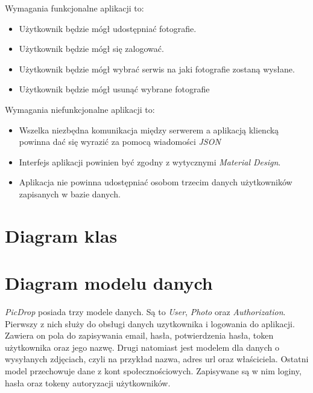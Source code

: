 \documentclass[brudnopis]{xmgr}
\begin{document}
 Wymagania funkcjonalne aplikacji to: 
\begin{itemize}
  \item Użytkownik będzie mógł udostępniać fotografie. 
  \item Użytkownik będzie mógł się zalogować.
  \item Użytkownik będzie mógł wybrać serwis na jaki fotografie zostaną wysłane.
  \item Użytkownik będzie mógł usunąć wybrane fotografie
\end{itemize}

Wymagania niefunkcjonalne aplikacji to: 
\begin{itemize}
  \item Wszelka niezbędna komunikacja między serwerem a aplikacją kliencką powinna dać się wyrazić za pomocą wiadomości \textit{JSON}
  \item Interfejs aplikacji powinien być zgodny z wytycznymi \textit{Material Design}.
  \item Aplikacja nie powinna udostępniać osobom trzecim danych użytkowników zapisanych w bazie danych.
\end{itemize}
  
\section{Diagram klas}

\section{Diagram modelu danych}
\textit{PicDrop} posiada trzy modele danych. Są to \textit{User}, \textit{Photo} oraz \textit{Authorization}. Pierwszy z nich służy do obsługi danych uzytkownika i logowania do aplikacji. Zawiera on pola do zapisywania email, hasła, potwierdzenia hasła, token użytkownika oraz jego nazwę. Drugi natomiast jest modelem dla danych o wysyłanych zdjęciach, czyli na przykład nazwa, adres url oraz właściciela. Ostatni model przechowuje dane z kont społecznościowych. Zapisywane są w nim loginy, hasła oraz tokeny autoryzacji użytkowników. 
\end{document}
